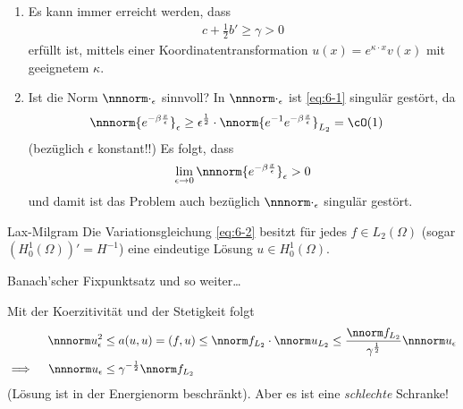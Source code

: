 \begin{bemerkung*}
  \begin{enumerate}
  \item   Es kann immer erreicht werden, dass
    \begin{align*}
      c + \frac 12 b' \geq \gamma > 0
    \end{align*}
    erfüllt ist, mittels einer Koordinatentransformation $u(x) = e^{\kappa \cdot x} v(x)$ mit geeignetem $\kappa$. 
  \item Ist die Norm $\nnnorm \cdot_{\epsilon}$ sinnvoll? In  $\nnnorm \cdot_{\epsilon}$ ist \eqref{eq:6-1} singulär gestört, da
    \begin{align*}
      \nnnorm {e^{- \beta \frac x \epsilon}}_{\epsilon} &\geq\epsilon^{\frac 12}\cdot \nnorm{e^{-1} e^{- \beta \frac x \epsilon}}_{L_{2}} = \cO(1)
    \end{align*}
    (bezüglich $\epsilon$ konstant!!) Es folgt, dass
    \begin{align*}
      \lim_{\epsilon \to 0}    \nnnorm {e^{- \beta \frac x \epsilon}}_{\epsilon}  > 0
    \end{align*}
    und damit ist das Problem auch bezüglich $\nnnorm \cdot _{\epsilon}$ singulär gestört. 
  \end{enumerate}
\end{bemerkung*}
\begin{lemma}\label{lem:6-1} Lax-Milgram
  Die Variationsgleichung \eqref{eq:6-2} besitzt für jedes $f \in L_{2}(\Omega)$ (sogar $(H_{0}^{1}(\Omega))' = H^{-1}$) eine eindeutige Lösung $u \in H_{0}^{1}(\Omega)$. 
\end{lemma}
\begin{beweis}
  Banach'scher Fixpunktsatz und so weiter\dots
\end{beweis}
\begin{bemerkung*}
  Mit der Koerzitivität und der Stetigkeit folgt
  \begin{align*}
    \nnnorm u_{\epsilon}^{2} &\leq a(u, u) = (f, u) \leq \nnorm f_{L_{2}} \cdot \nnorm u_{L_{2}} \leq \frac {\nnorm f_{L_{2}}}{\gamma^{\frac 1 2}} \nnnorm u_{\epsilon}\\
    \implies \quad \nnnorm u_{\epsilon} &\leq \gamma^{-\frac 1 2} \nnorm f_{L_{2}}
  \end{align*}
  (Lösung ist in der Energienorm beschränkt). Aber es ist eine \emph{schlechte} Schranke! 
\end{bemerkung*}

